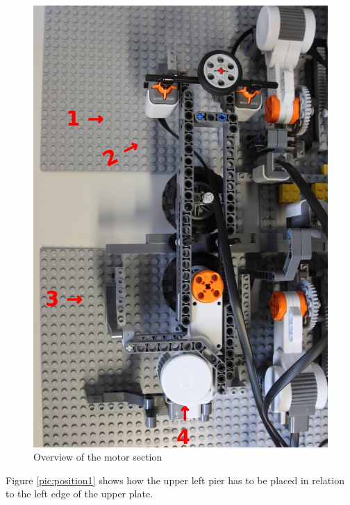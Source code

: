 \documentclass[%
  a4paper,%
  11pt,%
  blue,%
  hyperref	%
  ]{tubsartcl}
\begin{document}
\begin{figure}[!htb]
\begin{center}
\includegraphics[scale=0.28]{graphics_lego/topview.jpg}
\end{center}
\caption{Overview of the motor section}
\label{pic:topview}
\end{figure}

\newpage

Figure \ref{pic:position1} shows how the upper left pier has to be placed in relation to the left edge of the upper plate.
\end{document}
